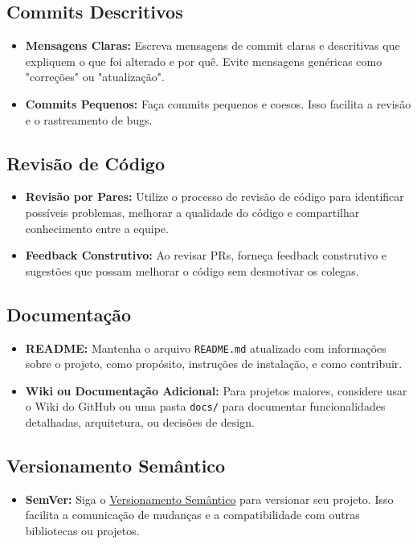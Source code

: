 \documentclass[a4paper,11pt]{article}
\begin{document}
\subsection{Commits Descritivos}
\begin{itemize}
	\item \textbf{Mensagens Claras:} Escreva mensagens de commit claras e descritivas que expliquem o que foi alterado e por quê. Evite mensagens genéricas como "correções" ou "atualização".
	\item \textbf{Commits Pequenos:} Faça commits pequenos e coesos. Isso facilita a revisão e o rastreamento de bugs.
\end{itemize}

\subsection{Revisão de Código}
\begin{itemize}
	\item \textbf{Revisão por Pares:} Utilize o processo de revisão de código para identificar possíveis problemas, melhorar a qualidade do código e compartilhar conhecimento entre a equipe.
	\item \textbf{Feedback Construtivo:} Ao revisar PRs, forneça feedback construtivo e sugestões que possam melhorar o código sem desmotivar os colegas.
\end{itemize}

\subsection{Documentação}
\begin{itemize}
	\item \textbf{README:} Mantenha o arquivo \texttt{README.md} atualizado com informações sobre o projeto, como propósito, instruções de instalação, e como contribuir.
	\item \textbf{Wiki ou Documentação Adicional:} Para projetos maiores, considere usar o Wiki do GitHub ou uma pasta \texttt{docs/} para documentar funcionalidades detalhadas, arquitetura, ou decisões de design.
\end{itemize}

\subsection{Versionamento Semântico}
\begin{itemize}
	\item \textbf{SemVer:} Siga o \href{https://semver.org/lang/pt-BR/}{Versionamento Semântico} para versionar seu projeto. Isso facilita a comunicação de mudanças e a compatibilidade com outras bibliotecas ou projetos.
\end{itemize}
\end{document}
